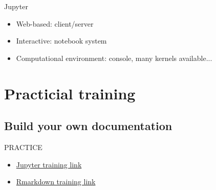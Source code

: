 \begin{frame}{Jupyter}
\begin{itemize}
\item<2-4> Web-based: client/server
\item<3-4> Interactive: notebook system
\item<4-4> Computational environment: console, many kernels available...
\end{itemize}
\end{frame}

\section{Practicial training}
\subsection{Build your own documentation}
\begin{frame}
\begin{block}{PRACTICE}
\begin{itemize}
\item \href{https://github.com/mesocentre-clermont-auvergne/formation_fair_2022/tree/main/fair_documentation/TP_jupyter}{Jupyter training link} 
\item \href{https://github.com/mesocentre-clermont-auvergne/formation_fair_2022/blob/main/fair_documentation/rmarkdown_TP/}{Rmarkdown training link}
\end{itemize}
\end{block}
\end{frame}
